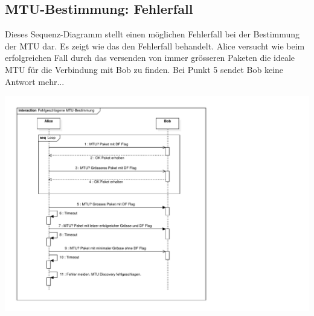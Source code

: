 \subsection{MTU-Bestimmung: Fehlerfall}
Dieses Sequenz-Diagramm stellt einen möglichen Fehlerfall bei der Bestimmung der MTU dar. Es zeigt wie das \tool den Fehlerfall behandelt. Alice versucht wie beim erfolgreichen Fall durch das versenden von immer grösseren Paketen die ideale MTU für die Verbindung mit Bob zu finden. Bei Punkt 5 sendet Bob keine Antwort mehr... %

\includegraphics[trim=10 10 265 10,clip,width=\textwidth]{mainpart/implementation/img/MTUBestimmungFehlerfall}